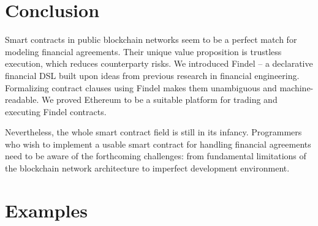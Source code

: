 \section{Conclusion}

Smart contracts in public blockchain networks seem to be a perfect match for modeling financial agreements.
Their unique value proposition is trustless execution, which reduces counterparty risks.
We introduced Findel -- a declarative financial DSL built upon ideas from previous research in financial engineering.
Formalizing contract clauses using Findel makes them unambiguous and machine-readable.
We proved Ethereum to be a suitable platform for trading and executing Findel contracts.

Nevertheless, the whole smart contract field is still in its infancy.
Programmers who wish to implement a usable smart contract for handling financial agreements need to be aware of the forthcoming challenges: from fundamental limitations of the blockchain network architecture to imperfect development environment.



\section{Examples} \label{sec:Ch10_Findel_Examples}

